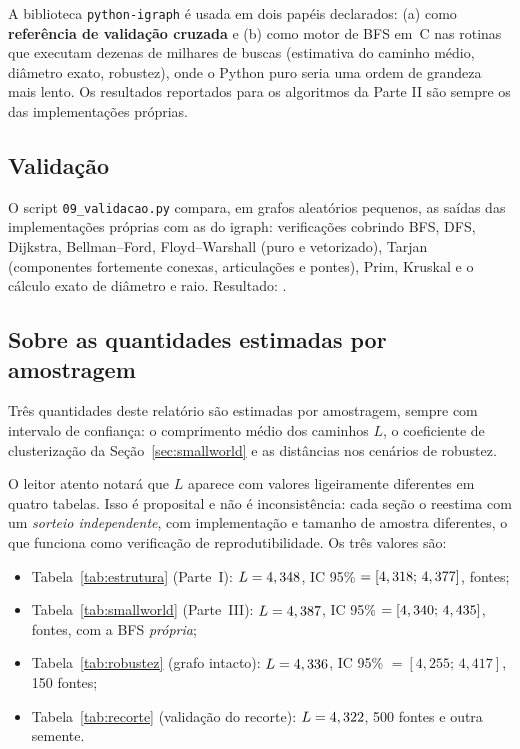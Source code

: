 \documentclass[sigconf]{webmedia}
\begin{document}
A biblioteca \texttt{python-igraph} é usada em dois papéis declarados:
(a) como \textbf{referência de validação cruzada} e (b) como motor de BFS
em~C nas rotinas que executam dezenas de milhares de buscas (estimativa do
caminho médio, diâmetro exato, robustez), onde o Python puro seria uma
ordem de grandeza mais lento. Os resultados reportados para os algoritmos
da Parte II são sempre os das implementações próprias.

\subsection{Validação}

O script \texttt{09\_validacao.py} compara, em \valGrafos{} grafos
aleatórios pequenos, as saídas das implementações próprias com as do
igraph: \valChecagens{} verificações cobrindo BFS, DFS, Dijkstra,
Bellman--Ford, Floyd--Warshall (puro e vetorizado), Tarjan (componentes
fortemente conexas, articulações e pontes), Prim, Kruskal e o cálculo
exato de diâmetro e raio. Resultado: \valStatus{}.

\subsection{Sobre as quantidades estimadas por amostragem}
\label{sec:amostragem}

Três quantidades deste relatório são estimadas por amostragem, sempre com
intervalo de confiança: o comprimento médio dos caminhos $L$, o
coeficiente de clusterização da Seção~\ref{sec:smallworld} e as distâncias
nos cenários de robustez.

O leitor atento notará que $L$ aparece com valores ligeiramente diferentes
em quatro tabelas. Isso é proposital e não é inconsistência: cada seção o
reestima com um \emph{sorteio independente}, com implementação e tamanho
de amostra diferentes, o que funciona como verificação de reprodutibilidade.
Os três valores são:

\begin{itemize}[nosep]
  \item Tabela~\ref{tab:estrutura} (Parte~I): $L = 4,348{}$,
        IC 95\% $=[4,318{};\,4,377{}]$, \LtresAn{} fontes;
  \item Tabela~\ref{tab:smallworld} (Parte~III): $L = 4,387{}$,
        IC 95\% $=[4,340{};\,4,435{}]$, \LtresBn{} fontes,
        com a BFS \emph{própria};
  \item Tabela~\ref{tab:robustez} (grafo intacto): $L = 4,336{}$,
        IC 95\% $=[4{,}255;\,4{,}417]$, 150 fontes;
  \item Tabela~\ref{tab:recorte} (validação do recorte):
        $L = 4,322{}$, 500 fontes e outra semente.
\end{itemize}
\end{document}
